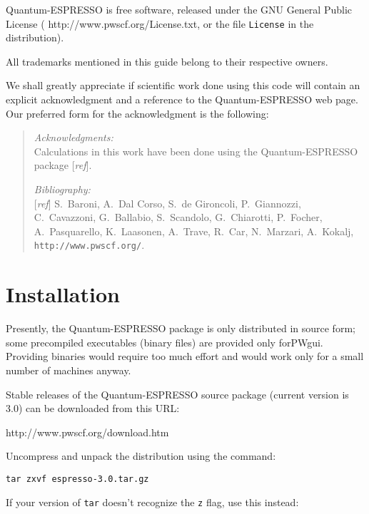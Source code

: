 \documentclass[12pt,a4paper]{article}
\def\stableversion{3.0} %
\begin{document}
Quantum-ESPRESSO is free software, released under the GNU General Public
License
(%
                   {http://www.pwscf.org/License.txt},
or the file \texttt{License} in the distribution).

All trademarks mentioned in this guide belong to their respective
owners.

We shall greatly appreciate if scientific work done using this code
will contain an explicit acknowledgment and a reference to the
Quantum-ESPRESSO web page.
Our preferred form for the acknowledgment is the following:

\begin{quote}
\emph{Acknowledgments:}\\
Calculations in this work have been done using the Quantum-ESPRESSO package
[\emph{ref}].
\par\noindent
\emph{Bibliography:}\\{}
[\emph{ref}]
S.~Baroni, A.~Dal Corso, S.~de Gironcoli, P.~Giannozzi, %
C.~Cavazzoni, G.~Ballabio, S.~Scandolo, G.~Chiarotti, P.~Focher, %
A.~Pasquarello, K.~Laasonen, A.~Trave, R.~Car, N.~Marzari, %
A.~Kokalj, %
\texttt{http://www.pwscf.org/}.
\end{quote}

\clearpage

\section{Installation}
  \label{installation}

Presently, the Quantum-ESPRESSO package is only distributed in source
form; some precompiled executables (binary files) are provided only
for\break PWgui. Providing binaries would require too much effort
and would work only for a small number of machines anyway.

Stable releases of the Quantum-ESPRESSO source package (current version
is \stableversion) can be downloaded from this URL:
\medskip

%
                  {http://www.pwscf.org/download.htm}
\medskip

\noindent
Uncompress and unpack the distribution using the command:
\medskip

\texttt{tar zxvf espresso-\stableversion.tar.gz}
\medskip

\noindent
If your version of \texttt{tar} doesn't recognize the \texttt{z} flag,
use this instead:
\medskip
\end{document}
